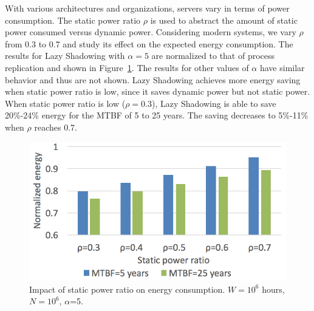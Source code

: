 With various architectures and organizations, servers
vary in terms of
power consumption. The static power ratio $\rho$ is used to abstract the
amount of static power consumed versus dynamic power. 
Considering modern systems, we vary $\rho$ from 0.3 to 0.7 and study its effect
on the expected energy consumption. The results for Lazy Shadowing with $\alpha=5$ are normalized to that of process replication and shown in 
Figure~\ref{fig:power_ratio}. The results for other values of $\alpha$ have similar behavior and thus are not shown. Lazy Shadowing achieves
more energy saving when static power ratio is low, since it saves dynamic 
power but not static power. When static power ratio is low ($\rho=0.3$), Lazy Shadowing
is able to save 20\%-24\% energy for the MTBF of 5 to 25 years. The saving decreases to 5\%-11\% when $\rho$ reaches 0.7. 

\begin{figure}[!t]
	\begin{center}
		\includegraphics[width=0.7\columnwidth]{Figures/ts_power_5}
	\end{center}
	\caption{Impact of static power ratio on energy consumption. $W=10^6$ hours, $N=10^6$, $\alpha$=5.}
	\label{fig:power_ratio}
\end{figure}
